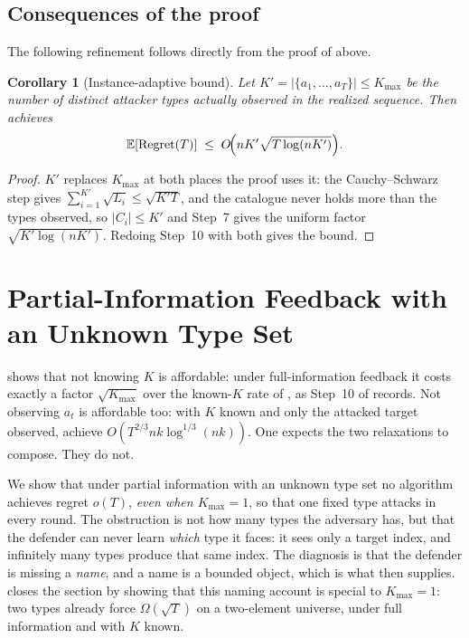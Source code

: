 \documentclass[letterpaper,9pt,twocolumn]{extarticle}
\newcommand{\EE}{\mathbb{E}}
\newcommand{\Kmax}{K_{\max}}
\newcommand{\Regret}{\mathrm{Regret}}
\theoremstyle{plain}
\newtheorem{corollary}[theorem]{Corollary}
\theoremstyle{definition}
\theoremstyle{remark}
\begin{document}
\subsection{Consequences of the proof}
\label{sec:consequences}

The following refinement follows directly from the proof of
 above.

\begin{corollary}[Instance-adaptive bound]
\label{cor:adaptive}
Let $K'=|\{a_1,\dots,a_T\}|\le\Kmax$ be the number of \emph{distinct}
attacker types actually observed in the realized sequence. Then
 achieves
\[
\EE[\Regret(T)]\;\le\;O\!\Bigl(nK'\sqrt{T\log (nK')}\Bigr).
\]
\end{corollary}

\begin{proof}
$K'$ replaces $\Kmax$ at both places the proof uses it: the Cauchy--Schwarz
step  gives $\sum_{i=1}^{K'}\sqrt{L_i}\le\sqrt{K'T}$, and the
catalogue never holds more than the types observed, so $|C_i|\le K'$ and
Step~7 gives the uniform factor $\sqrt{K'\log(nK')}$. Redoing Step~10 with
both gives the bound.\end{proof}



\section{Partial-Information Feedback with an Unknown Type Set}
\label{sec:partial}

 shows that not knowing $K$ is affordable: under
full-information feedback it costs exactly a factor $\sqrt{\Kmax}$ over the
known-$K$ rate of \citet[Theorem 5.1]{balcan2015}, as Step~10 of
 records. Not observing $a_t$ is affordable
too: with $K$ known and only the attacked target observed,
\citet[Theorem 6.1]{balcan2015} achieve $O(T^{2/3}nk\log^{1/3}(nk))$. One
expects the two relaxations to compose. They do not.

We show that under partial information with an unknown type set no algorithm
achieves regret $o(T)$, \emph{even when $\Kmax=1$}, so that one fixed type
attacks in every round. The obstruction is not how many types the adversary
has, but that the defender can never learn \emph{which} type it faces: it
sees only a target index, and infinitely many types produce that same index.
The diagnosis is that the defender is missing a \emph{name}, and a name is a
bounded object, which is what  then supplies.
 closes the section by showing that this naming account is
special to $\Kmax=1$: two types already force $\Omega(\sqrt T)$ on a
two-element universe, under full information and with $K$ known.
\end{document}

